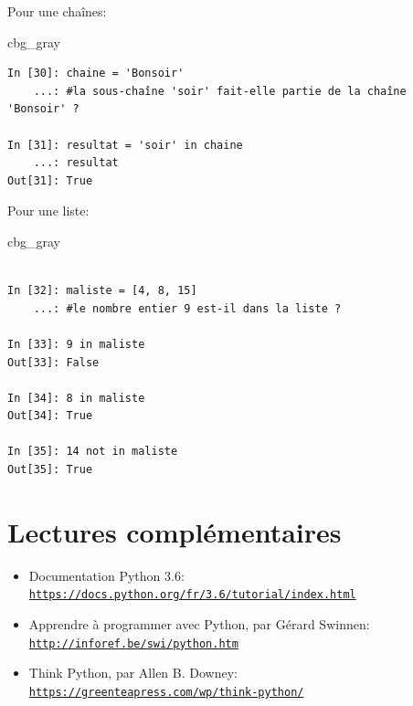 \documentclass[%
oneside,                 %
final,                   %
10pt]{article}
\newenvironment{_cod_tight}[1]{
   \def\FrameCommand{\colorbox{#1}}
   \FrameRule0.6pt\MakeFramed {\FrameRestore}\vskip3mm}
   {\vskip0mm\endMakeFramed}
\newenvironment{cod}[1]{
\bgroup\rmfamily
\fboxsep=0mm\relax
\begin{_cod_tight}{#1}
\list{}{\parsep=-2mm\parskip=0mm\topsep=0pt\leftmargin=2mm
\rightmargin=2\leftmargin\leftmargin=4pt\relax}
\item\relax}
{\endlist\end{_cod_tight}\egroup}
\begin{document}
Pour une chaînes:
\begin{cod}{cbg_gray}\begin{verbatim}
In [30]: chaine = 'Bonsoir'
    ...: #la sous-chaîne 'soir' fait-elle partie de la chaîne 'Bonsoir' ?

In [31]: resultat = 'soir' in chaine
    ...: resultat
Out[31]: True
\end{verbatim}
\end{cod}
\noindent

Pour une liste:

\begin{cod}{cbg_gray}\begin{verbatim}

In [32]: maliste = [4, 8, 15]
    ...: #le nombre entier 9 est-il dans la liste ?

In [33]: 9 in maliste
Out[33]: False

In [34]: 8 in maliste
Out[34]: True

In [35]: 14 not in maliste
Out[35]: True
\end{verbatim}
\end{cod}
\noindent


\section{Lectures complémentaires}

\begin{itemize}
\item Documentation Python 3.6: \href{{https://docs.python.org/fr/3.6/tutorial/index.html}}{\nolinkurl{https://docs.python.org/fr/3.6/tutorial/index.html}}

\item Apprendre à programmer avec Python, par Gérard Swinnen: \href{{http://inforef.be/swi/python.htm}}{\nolinkurl{http://inforef.be/swi/python.htm}}

\item Think Python, par Allen B. Downey: \href{{https://greenteapress.com/wp/think-python/}}{\nolinkurl{https://greenteapress.com/wp/think-python/}}
\end{itemize}

\noindent


\end{document}
